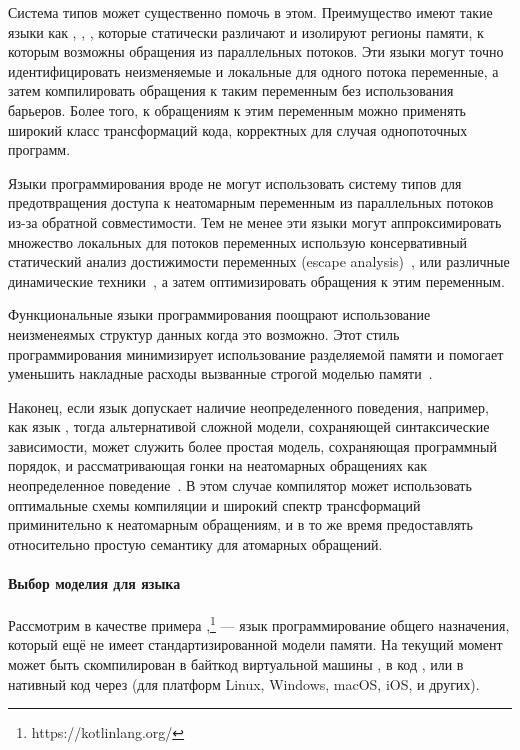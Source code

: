 Система типов может существенно помочь в этом. 
Преимущество имеют такие языки как \Haskell, \OCaml, \Rust, 
которые статически различают и изолируют регионы памяти, 
к которым возможны обращения из параллельных потоков. 
Эти языки могут точно идентифицировать неизменяемые 
и локальные для одного потока переменные, 
а затем компилировать обращения к таким переменным 
без использования барьеров. 
Более того, к обращениям к этим переменным 
можно применять широкий класс трансформаций кода, 
корректных для случая однопоточных программ. 
 
Языки программирования вроде \Java не могут
использовать систему типов для предотвращения 
доступа к неатомарным переменным из параллельных потоков
из-за обратной совместимости.
Тем не менее эти языки
могут аппроксимировать множество локальных 
для потоков переменных использую консервативный 
статический анализ достижимости переменных 
(escape analysis)~\cite{Choi-al:OOPSLA1999}, 
или различные динамические техники~\cite{Liu-al:PLDI19},
а затем оптимизировать обращения к этим переменным.  

Функциональные языки программирования поощрают 
использование неизменеямых структур данных когда 
это возможно. Этот стиль программирования минимизирует
использование разделяемой памяти и помогает 
уменьшить накладные расходы вызванные 
строгой моделью памяти~\cite{Vollmer-al:PPoPP17}.  

Наконец, если язык допускает наличие неопределенного поведения, 
например, как язык \CPP, тогда альтернативой сложной модели, 
сохраняющей синтаксические зависимости, 
может служить более простая модель, сохраняющая программный порядок, 
и рассматривающая гонки на неатомарных обращениях как 
неопределенное поведение~\cite{Boehm-Demsky:MSPC14, Ou-Demsky:OOPSLA18}.
В этом случае компилятор может использовать оптимальные 
схемы компиляции и широкий спектр трансформаций приминительно к неатомарным обращениям,
и в то же время предоставлять относительно простую семантику 
для атомарных обращений. 

\paragraph{Выбор моделия для языка \Kotlin}

Рассмотрим в качестве примера \Kotlin,\footnote{https://kotlinlang.org/} --- 
язык программирование общего назначения, который ещё 
не имеет стандартизированной модели памяти. 
На текущий момент \Kotlin может быть скомпилирован 
в байткод виртуальной машины \Java, в код \JS, 
или в нативный код через \LLVM
(для платформ Linux, Windows, macOS, iOS, и других).

